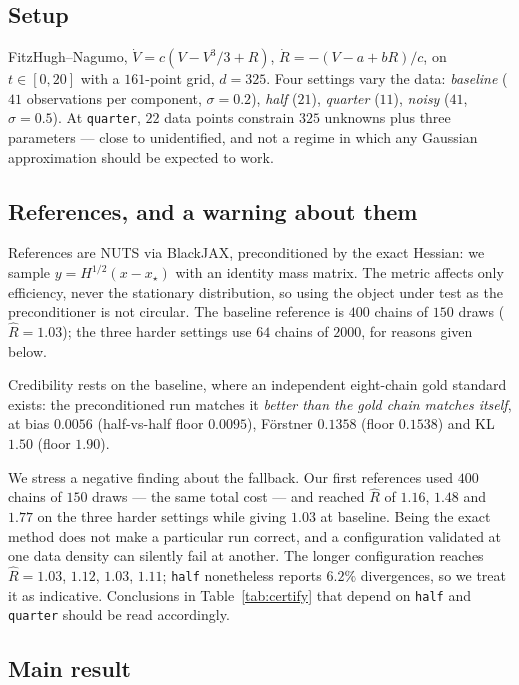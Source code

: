\documentclass[11pt]{article}
\newcommand{\xmap}{x_{\star}}
\newcommand{\code}[1]{\texttt{\small #1}}
\newcommand{\Rhat}{\widehat{R}}
\theoremstyle{plain}
\theoremstyle{definition}
\theoremstyle{remark}
\begin{document}
\subsection{Setup}

FitzHugh--Nagumo, $\dot V = c(V - V^3/3 + R)$, $\dot R = -(V - a + bR)/c$, on $t\in[0,20]$ with a
$161$-point grid, $d = 325$. Four settings vary the data: \emph{baseline} ($41$ observations per
component, $\sigma = 0.2$), \emph{half} ($21$), \emph{quarter} ($11$), \emph{noisy} ($41$, $\sigma =
0.5$). At \code{quarter}, $22$ data points constrain $325$ unknowns plus three parameters --- close
to unidentified, and not a regime in which any Gaussian approximation should be expected to work.

\subsection{References, and a warning about them}

References are NUTS \cite{hoffman2014} via BlackJAX, preconditioned by the exact Hessian: we sample
$y = H^{1/2}(x-\xmap)$ with an identity mass matrix. The metric affects only efficiency, never the
stationary distribution, so using the object under test as the preconditioner is not circular. The
baseline reference is $400$ chains of $150$ draws ($\Rhat = 1.03$); the three harder settings use
$64$ chains of $2000$, for reasons given below.

Credibility rests on the baseline, where an independent eight-chain gold standard exists: the
preconditioned run matches it \emph{better than the gold chain matches itself}, at bias $0.0056$
(half-vs-half floor $0.0095$), F\"orstner $0.1358$ (floor $0.1538$) and KL $1.50$ (floor $1.90$).

We stress a negative finding about the fallback. Our first references used $400$ chains of $150$
draws --- the same total cost --- and reached $\Rhat$ of $1.16$, $1.48$ and $1.77$ on the three
harder settings while giving $1.03$ at baseline. Being the exact method does not make a particular
run correct, and a configuration validated at one data density can silently fail at another. The
longer configuration reaches $\Rhat = 1.03$, $1.12$, $1.03$, $1.11$; \code{half} nonetheless reports
$6.2\%$ divergences, so we treat it as indicative. Conclusions in Table~\ref{tab:certify} that
depend on \code{half} and \code{quarter} should be read accordingly.

\subsection{Main result}
\end{document}
